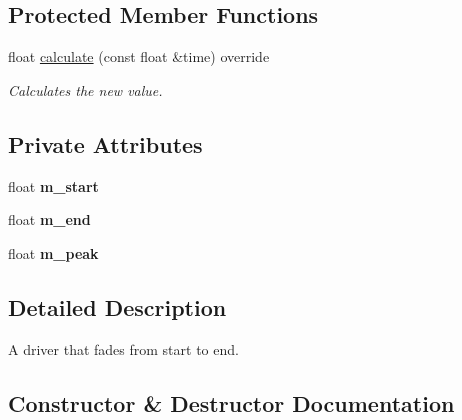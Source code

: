 \subsection*{Protected Member Functions}
\begin{DoxyCompactItemize}
\item 
float \hyperlink{classflounder_1_1driverfade_af0720c2a60e768dfa9702a43969bf65d}{calculate} (const float \&time) override
\begin{DoxyCompactList}\small\item\em Calculates the new value. \end{DoxyCompactList}\end{DoxyCompactItemize}
\subsection*{Private Attributes}
\begin{DoxyCompactItemize}
\item 
\mbox{\label{classflounder_1_1driverfade_a0116d4678be3c6de69137836a066dd14}} 
float {\bfseries m\+\_\+start}
\item 
\mbox{\label{classflounder_1_1driverfade_aedbb138185ff786053444437da900553}} 
float {\bfseries m\+\_\+end}
\item 
\mbox{\label{classflounder_1_1driverfade_a536ef333071a5120c49553748c3046ff}} 
float {\bfseries m\+\_\+peak}
\end{DoxyCompactItemize}


\subsection{Detailed Description}
A driver that fades from start to end. 



\subsection{Constructor \& Destructor Documentation}
\mbox{\label{classflounder_1_1driverfade_a4aa6c6ec1352f9af77c218f4483896e7}} 
